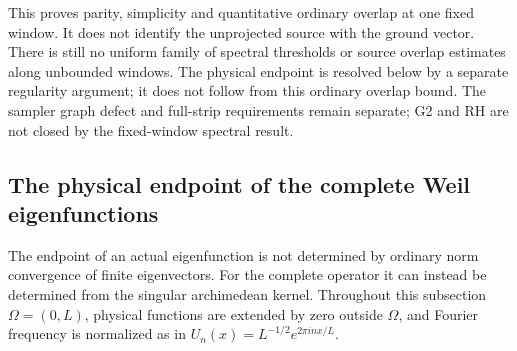 \documentclass[11pt]{article}
\theoremstyle{remark}
\begin{document}
This proves parity, simplicity and quantitative ordinary overlap at one
fixed window. It does not identify the unprojected source with the
ground vector. There is still no uniform family of spectral thresholds
or source overlap estimates along unbounded windows. The physical
endpoint is resolved below by a separate regularity argument; it does
not follow from this ordinary overlap bound. The sampler graph defect
and full-strip requirements remain separate; G2 and RH are not closed
by the fixed-window spectral result.

\subsection{The physical endpoint of the complete Weil eigenfunctions}

The endpoint of an actual eigenfunction is not determined by ordinary
norm convergence of finite eigenvectors.  For the complete operator it
can instead be determined from the singular archimedean kernel.
Throughout this subsection $\Omega=(0,L)$, physical functions are
extended by zero outside $\Omega$, and Fourier frequency is normalized
as in $U_n(x)=L^{-1/2}e^{2\pi inx/L}$.
\end{document}
